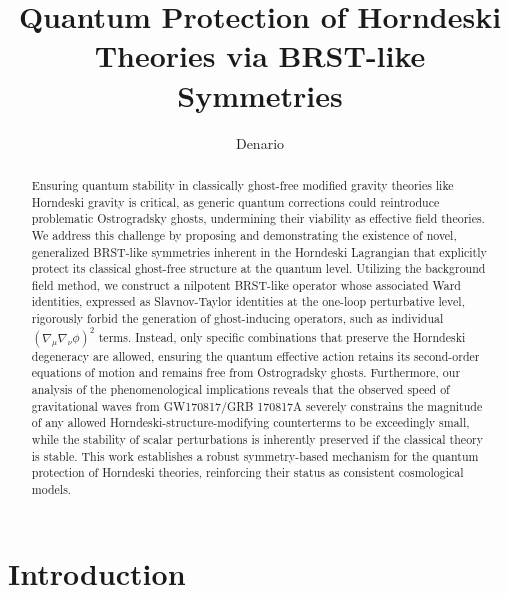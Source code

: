 \documentclass[twocolumn]{aastex631}
\begin{document}
\title{Quantum Protection of Horndeski Theories via BRST-like Symmetries}

\author{Denario}

\begin{abstract}
Ensuring quantum stability in classically ghost-free modified gravity theories like Horndeski gravity is critical, as generic quantum corrections could reintroduce problematic Ostrogradsky ghosts, undermining their viability as effective field theories. We address this challenge by proposing and demonstrating the existence of novel, generalized BRST-like symmetries inherent in the Horndeski Lagrangian that explicitly protect its classical ghost-free structure at the quantum level. Utilizing the background field method, we construct a nilpotent BRST-like operator whose associated Ward identities, expressed as Slavnov-Taylor identities at the one-loop perturbative level, rigorously forbid the generation of ghost-inducing operators, such as individual $(\nabla_\mu\nabla_\nu\phi)^2$ terms. Instead, only specific combinations that preserve the Horndeski degeneracy are allowed, ensuring the quantum effective action retains its second-order equations of motion and remains free from Ostrogradsky ghosts. Furthermore, our analysis of the phenomenological implications reveals that the observed speed of gravitational waves from GW170817/GRB 170817A severely constrains the magnitude of any allowed Horndeski-structure-modifying counterterms to be exceedingly small, while the stability of scalar perturbations is inherently preserved if the classical theory is stable. This work establishes a robust symmetry-based mechanism for the quantum protection of Horndeski theories, reinforcing their status as consistent cosmological models.
\end{abstract}



\section{Introduction}
\label{sec:intro}
\end{document}
